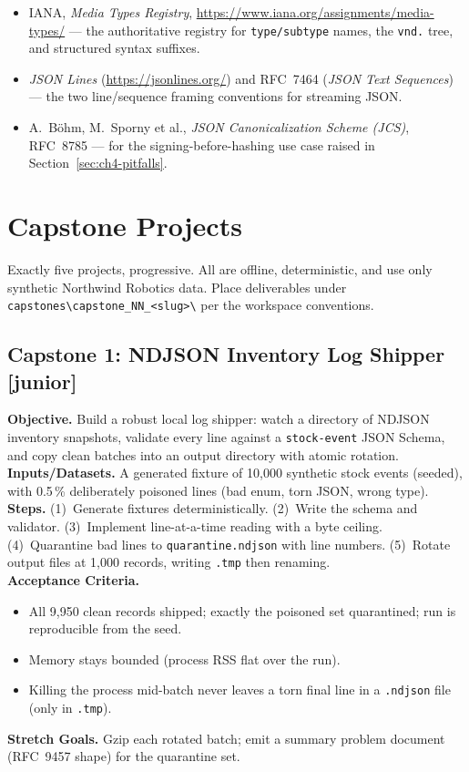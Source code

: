 \begin{itemize}
        Section~\ref{sec:ch4-avro-msgpack}.
  \item IANA, \emph{Media Types Registry},
        \url{https://www.iana.org/assignments/media-types/} --- the authoritative
        registry for \texttt{type/subtype} names, the \texttt{vnd.} tree, and
        structured syntax suffixes.
  \item \emph{JSON Lines} (\url{https://jsonlines.org/}) and RFC~7464
        (\emph{JSON Text Sequences}) --- the two line/sequence framing
        conventions for streaming JSON.
  \item A.~B\"ohm, M.~Sporny et al., \emph{JSON Canonicalization Scheme (JCS)},
        RFC~8785 --- for the signing-before-hashing use case raised in
        Section~\ref{sec:ch4-pitfalls}.
\end{itemize}

\section{Capstone Projects}
\label{sec:ch4-capstones}

Exactly five projects, progressive. All are offline, deterministic, and use only
synthetic Northwind Robotics data. Place deliverables under
\texttt{capstones\textbackslash{}capstone\_NN\_<slug>\textbackslash{}} per the
workspace conventions.

\subsection{Capstone 1: NDJSON Inventory Log Shipper [junior]}
\textbf{Objective.} Build a robust local log shipper: watch a directory of NDJSON
inventory snapshots, validate every line against a \texttt{stock-event} JSON
Schema, and copy clean batches into an output directory with atomic rotation.\\
\textbf{Inputs/Datasets.} A generated fixture of 10{,}000 synthetic stock events
(seeded), with 0.5\,\% deliberately poisoned lines (bad enum, torn JSON, wrong
type).\\
\textbf{Steps.} (1)~Generate fixtures deterministically. (2)~Write the schema and
validator. (3)~Implement line-at-a-time reading with a byte ceiling.
(4)~Quarantine bad lines to \texttt{quarantine.ndjson} with line numbers.
(5)~Rotate output files at 1{,}000 records, writing \texttt{.tmp} then renaming.\\
\textbf{Acceptance Criteria.}
\begin{itemize}
  \item[$\square$] All 9{,}950 clean records shipped; exactly the poisoned set
        quarantined; run is reproducible from the seed.
  \item[$\square$] Memory stays bounded (process RSS flat over the run).
  \item[$\square$] Killing the process mid-batch never leaves a torn final line in
        a \texttt{.ndjson} file (only in \texttt{.tmp}).
\end{itemize}
\textbf{Stretch Goals.} Gzip each rotated batch; emit a summary problem document
(RFC~9457 shape) for the quarantine set.

